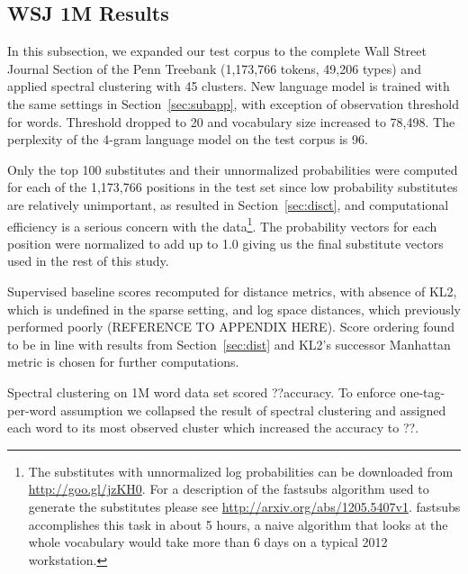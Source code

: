 \subsection{WSJ 1M Results}
\label{sec:wsj}

In this subsection, we expanded our test corpus to the complete Wall
Street Journal Section of the Penn Treebank \cite{treebank3}
(1,173,766 tokens, 49,206 types) and applied spectral clustering with
45 clusters.
%
New language model is trained with the same settings in
Section~\ref{sec:subapp}, with exception of observation threshold for
words.  Threshold dropped to 20 and vocabulary size increased to
78,498.
%
The perplexity of the 4-gram language model on the test corpus is 96.

Only the top 100 substitutes and their unnormalized probabilities were
computed for each of the 1,173,766 positions in the test set since low
probability substitutes are relatively unimportant, as resulted in
Section~\ref{sec:disct}, and computational efficiency is a serious
concern with the data\footnote{The substitutes with unnormalized log
  probabilities can be downloaded from
  \mbox{\url{http://goo.gl/jzKH0}}.  For a description of the {\sc
    fastsubs} algorithm used to generate the substitutes please see
  \mbox{\url{http://arxiv.org/abs/1205.5407v1}}.  {\sc fastsubs}
  accomplishes this task in about 5 hours, a naive algorithm that
  looks at the whole vocabulary would take more than 6 days on a
  typical 2012 workstation.}.  The probability vectors for each
position were normalized to add up to 1.0 giving us the final
substitute vectors used in the rest of this study.

Supervised baseline scores recomputed for distance metrics, with
absence of KL2, which is undefined in the sparse setting, and log
space distances, which previously performed poorly (REFERENCE TO
APPENDIX HERE). Score ordering found to be in line with results from
Section~\ref{sec:dist} and KL2's successor Manhattan metric is chosen
for further computations.


Spectral clustering on 1M word data set scored ??\mto accuracy.  To
enforce one-tag-per-word assumption we collapsed the result of
spectral clustering and assigned each word to its most observed
cluster which increased the \mto accuracy to ??.
